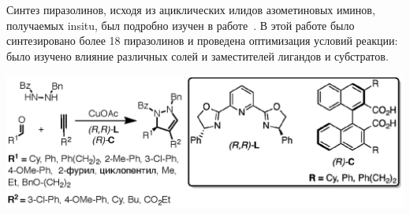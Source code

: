 

Синтез пиразолинов, исходя из ациклических илидов азометиновых иминов, получаемых \ac{insitu}, был подробно изучен в работе~\cite{Hashimoto2013}.
В этой работе было синтезировано более \num{18} пиразолинов и проведена оптимизация условий реакции: было изучено влияние различных солей  и заместителей лигандов и субстратов.

\begin{scheme}
    \centering
    \includegraphics{sections/literature/img/cycloaddition_example.eps}
    \caption{}
    \label{sch:cycloaddition_example}
\end{scheme}

